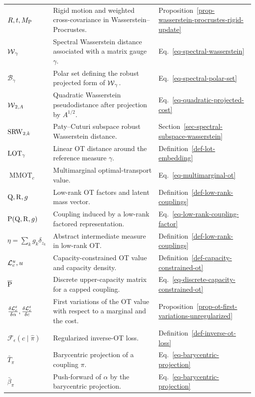 {\begin{longtable}{>{\raggedright\arraybackslash}p{}
                  >{\raggedright\arraybackslash}p{}
                  >{\raggedright\arraybackslash}p{}}
$R,t,M_\P$ & Rigid motion and weighted cross-covariance in Wasserstein--Procrustes. & Proposition~\ref{prop-wasserstein-procrustes-rigid-update} \\
$\Wass_\gamma$ & Spectral Wasserstein distance associated with a matrix gauge $\gamma$. & Eq.~\eqref{eq-spectral-wasserstein} \\
$\mathcal B_\gamma$ & Polar set defining the robust projected form of $\Wass_\gamma$. & Eq.~\eqref{eq-spectral-polar-set} \\
$\Wass_{2,A}$ & Quadratic Wasserstein pseudodistance after projection by $A^{1/2}$. & Eq.~\eqref{eq-quadratic-projected-cost} \\
$\SRW_{2,k}$ & Paty--Cuturi subspace robust Wasserstein distance. & Section~\ref{sec-spectral-subspace-wasserstein} \\
$\LOT_\gamma$ & Linear OT distance around the reference measure $\gamma$. & Definition~\ref{def-lot-embedding} \\
$\operatorname{MMOT}_c$ & Multimarginal optimal-transport value. & Eq.~\eqref{eq-multimarginal-ot} \\
$\Q,\R,g$ & Low-rank OT factors and latent mass vector. & Definition~\ref{def-low-rank-couplings} \\
$\P(\Q,\R,g)$ & Coupling induced by a low-rank factored representation. & Eq.~\eqref{eq-low-rank-coupling-factor} \\
$\eta=\sum_k g_k\delta_{z_k}$ & Abstract intermediate measure in low-rank OT\@. & Definition~\ref{def-low-rank-couplings} \\
$\MK_c^u,u$ & Capacity-constrained OT value and capacity density. & Definition~\ref{def-capacity-constrained-ot} \\
$\overline{\P}$ & Discrete upper-capacity matrix for a capped coupling. & Eq.~\eqref{eq-discrete-capacity-constrained-ot} \\
$\frac{\delta \MK_c^\epsilon}{\delta\alpha},\frac{\delta \MK_c^\epsilon}{\delta c}$ & First variations of the OT value with respect to a marginal and the cost. & Proposition~\ref{prop-ot-first-variations-unregularized} \\
$\mathcal F_\epsilon(c\mid\widehat\pi)$ & Regularized inverse-OT loss. & Definition~\ref{def-inverse-ot-loss} \\
$\bar T_\pi$ & Barycentric projection of a coupling $\pi$. & Eq.~\eqref{eq-barycentric-projection} \\
$\bar\beta_\pi$ & Push-forward of $\alpha$ by the barycentric projection. & Eq.~\eqref{eq-barycentric-projection} \\

\end{longtable}}
